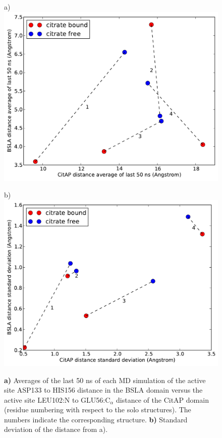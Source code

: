 \documentclass[english, a4paper, 12pt, titlepage, draft]{article}
\begin{document}
\begin{figure}
    \begin{minipage}[]{0.45\linewidth}
        \centering
        a)
        \includegraphics[width=\textwidth]{figures/CitAP_BSLA_distance/BSLA_CitAP_analyzed_with_average_of_last_50_ns.pdf}  
    \end{minipage}
\hspace{0.5cm}
    \begin{minipage}[]{0.45\linewidth}
        \centering
        b)
        \includegraphics[width=\textwidth]{figures/CitAP_BSLA_distance/BSLA_CitAP_analyzed_with_standard_deviation.pdf}  
    \end{minipage}
    \caption{\textbf{a)} Averages of the last 50 ns of each MD simulation of the active site ASP133 to HIS156 distance in the BSLA domain versus the active site LEU102:N to GLU56:C$_{\alpha}$ distance of the CitAP domain (residue numbering with respect to the solo structures).
        The numbers indicate the corresponding structure.
        \textbf{b)} Standard deviation of the distance from a).}
\label{fig:active_site_mean_sd}
\end{figure}     
\end{document}
